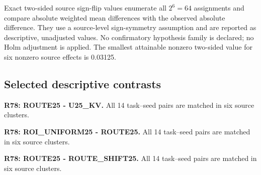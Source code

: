 Exact two-sided source sign-flip values enumerate all $2^6=64$ assignments and compare absolute weighted mean differences with the observed absolute difference. They use a source-level sign-symmetry assumption and are reported as descriptive, unadjusted values. No confirmatory hypothesis family is declared; no Holm adjustment is applied. The smallest attainable nonzero two-sided value for six nonzero source effects is 0.03125.

\subsection{Selected descriptive contrasts}

\noindent\textbf{R78: ROUTE25 - U25\_KV.} All 14 task--seed pairs are matched in six source clusters.

\noindent\textbf{R78: ROI\_UNIFORM25 - ROUTE25.} All 14 task--seed pairs are matched in six source clusters.

\noindent\textbf{R78: ROUTE25 - ROUTE\_SHIFT25.} All 14 task--seed pairs are matched in six source clusters.

